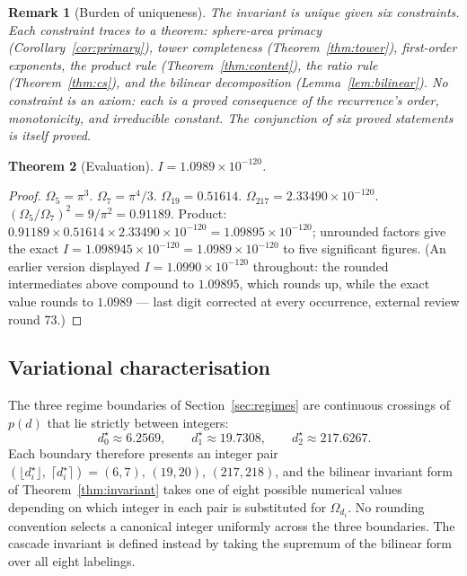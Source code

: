 \documentclass[11pt,a4paper]{article}
\newtheorem{theorem}{Theorem}[section]
\newtheorem{remark}[theorem]{Remark}
\begin{document}
\begin{remark}[Burden of uniqueness]\label{rem:burden}
The invariant is unique given six constraints. Each constraint traces to a
theorem: sphere-area primacy (Corollary~\ref{cor:primary}), tower
completeness (Theorem~\ref{thm:tower}), first-order exponents, the product
rule (Theorem~\ref{thm:content}), the ratio rule
(Theorem~\ref{thm:cs}), and the bilinear decomposition
(Lemma~\ref{lem:bilinear}). No constraint is an axiom: each is a proved
consequence of the recurrence's order, monotonicity, and
irreducible constant. The conjunction of six proved statements is itself
proved.
\end{remark}

\begin{theorem}[Evaluation]
$I = 1.0989\times 10^{-120}$.
\end{theorem}

\begin{proof}
$\Omega_5 = \pi^3$.\;
$\Omega_7 = \pi^4/3$.\;
$\Omega_{19} = 0.51614$.\;
$\Omega_{217} = 2.33490\times 10^{-120}$.\;
$(\Omega_5/\Omega_7)^2 = 9/\pi^2 = 0.91189$.\;
Product: $0.91189\times 0.51614\times 2.33490\times 10^{-120}
= 1.09895\times 10^{-120}$; unrounded factors give the exact
$I = 1.098945\times 10^{-120} = 1.0989\times 10^{-120}$ to five
significant figures. (An earlier version displayed
$I = 1.0990\times 10^{-120}$ throughout: the rounded intermediates
above compound to $1.09895$, which rounds up, while the exact value
rounds to $1.0989$ --- last digit corrected at every occurrence,
external review round 73.)
\end{proof}

\subsection{Variational characterisation}\label{sec:variational}

The three regime boundaries of Section~\ref{sec:regimes} are continuous
crossings of $p(d)$ that lie strictly between integers:
\[
d_0^\star \approx 6.2569,\qquad
d_1^\star \approx 19.7308,\qquad
d_2^\star \approx 217.6267.
\]
Each boundary therefore presents an integer pair
$(\lfloor d_i^\star\rfloor,\;\lceil d_i^\star\rceil) =
(6,7),\,(19,20),\,(217,218)$, and the bilinear invariant form of
Theorem~\ref{thm:invariant} takes one of eight possible numerical values
depending on which integer in each pair is substituted for
$\Omega_{d_i}$. No rounding convention selects a canonical integer
uniformly across the three boundaries. The cascade invariant is
defined instead by taking the supremum of the bilinear form over all
eight labelings.
\end{document}
